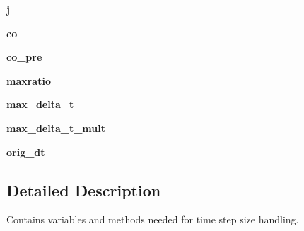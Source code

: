\begin{DoxyCompactItemize}
\item 
\hypertarget{classsmoderp2d_1_1src_1_1courant_1_1Courant_ad7980557f43390dbafa7a32c2eb5587f}{{\bfseries j}}\label{classsmoderp2d_1_1src_1_1courant_1_1Courant_ad7980557f43390dbafa7a32c2eb5587f}

\item 
\hypertarget{classsmoderp2d_1_1src_1_1courant_1_1Courant_a1ce8167e370399dae153ffac1a9506cd}{{\bfseries co}}\label{classsmoderp2d_1_1src_1_1courant_1_1Courant_a1ce8167e370399dae153ffac1a9506cd}

\item 
\hypertarget{classsmoderp2d_1_1src_1_1courant_1_1Courant_ad30d2f98a2d53cac3e07e7e0b3cedd39}{{\bfseries co\-\_\-pre}}\label{classsmoderp2d_1_1src_1_1courant_1_1Courant_ad30d2f98a2d53cac3e07e7e0b3cedd39}

\item 
\hypertarget{classsmoderp2d_1_1src_1_1courant_1_1Courant_aca2e98eb52dc3dcd664209462b181ba1}{{\bfseries maxratio}}\label{classsmoderp2d_1_1src_1_1courant_1_1Courant_aca2e98eb52dc3dcd664209462b181ba1}

\item 
\hypertarget{classsmoderp2d_1_1src_1_1courant_1_1Courant_a03e5161b202d6d9ecaa2ab6bc2f6364c}{{\bfseries max\-\_\-delta\-\_\-t}}\label{classsmoderp2d_1_1src_1_1courant_1_1Courant_a03e5161b202d6d9ecaa2ab6bc2f6364c}

\item 
\hypertarget{classsmoderp2d_1_1src_1_1courant_1_1Courant_a4cd64dfec3bd294d881fd28581250b45}{{\bfseries max\-\_\-delta\-\_\-t\-\_\-mult}}\label{classsmoderp2d_1_1src_1_1courant_1_1Courant_a4cd64dfec3bd294d881fd28581250b45}

\item 
\hypertarget{classsmoderp2d_1_1src_1_1courant_1_1Courant_ae5af3c6c7c3c4a048d92af266d8abeca}{{\bfseries orig\-\_\-dt}}\label{classsmoderp2d_1_1src_1_1courant_1_1Courant_ae5af3c6c7c3c4a048d92af266d8abeca}

\end{DoxyCompactItemize}


\subsection{Detailed Description}
Contains variables and methods needed for time step size handling. 




